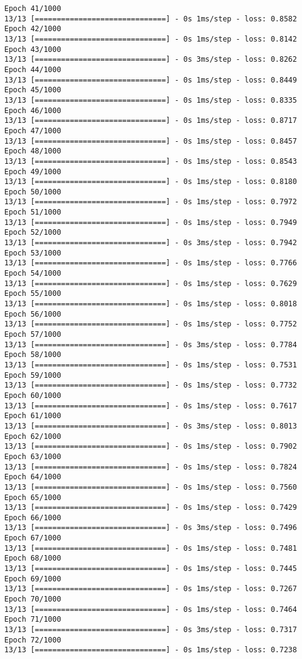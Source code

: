 \documentclass[11pt]{article}
\begin{document}
\begin{Verbatim}[commandchars=\\\{\}]
Epoch 41/1000
13/13 [==============================] - 0s 1ms/step - loss: 0.8582
Epoch 42/1000
13/13 [==============================] - 0s 1ms/step - loss: 0.8142
Epoch 43/1000
13/13 [==============================] - 0s 3ms/step - loss: 0.8262
Epoch 44/1000
13/13 [==============================] - 0s 1ms/step - loss: 0.8449
Epoch 45/1000
13/13 [==============================] - 0s 1ms/step - loss: 0.8335
Epoch 46/1000
13/13 [==============================] - 0s 1ms/step - loss: 0.8717
Epoch 47/1000
13/13 [==============================] - 0s 1ms/step - loss: 0.8457
Epoch 48/1000
13/13 [==============================] - 0s 1ms/step - loss: 0.8543
Epoch 49/1000
13/13 [==============================] - 0s 1ms/step - loss: 0.8180
Epoch 50/1000
13/13 [==============================] - 0s 1ms/step - loss: 0.7972
Epoch 51/1000
13/13 [==============================] - 0s 1ms/step - loss: 0.7949
Epoch 52/1000
13/13 [==============================] - 0s 3ms/step - loss: 0.7942
Epoch 53/1000
13/13 [==============================] - 0s 1ms/step - loss: 0.7766
Epoch 54/1000
13/13 [==============================] - 0s 1ms/step - loss: 0.7629
Epoch 55/1000
13/13 [==============================] - 0s 1ms/step - loss: 0.8018
Epoch 56/1000
13/13 [==============================] - 0s 1ms/step - loss: 0.7752
Epoch 57/1000
13/13 [==============================] - 0s 3ms/step - loss: 0.7784
Epoch 58/1000
13/13 [==============================] - 0s 1ms/step - loss: 0.7531
Epoch 59/1000
13/13 [==============================] - 0s 1ms/step - loss: 0.7732
Epoch 60/1000
13/13 [==============================] - 0s 1ms/step - loss: 0.7617
Epoch 61/1000
13/13 [==============================] - 0s 3ms/step - loss: 0.8013
Epoch 62/1000
13/13 [==============================] - 0s 1ms/step - loss: 0.7902
Epoch 63/1000
13/13 [==============================] - 0s 1ms/step - loss: 0.7824
Epoch 64/1000
13/13 [==============================] - 0s 1ms/step - loss: 0.7560
Epoch 65/1000
13/13 [==============================] - 0s 1ms/step - loss: 0.7429
Epoch 66/1000
13/13 [==============================] - 0s 3ms/step - loss: 0.7496
Epoch 67/1000
13/13 [==============================] - 0s 1ms/step - loss: 0.7481
Epoch 68/1000
13/13 [==============================] - 0s 1ms/step - loss: 0.7445
Epoch 69/1000
13/13 [==============================] - 0s 1ms/step - loss: 0.7267
Epoch 70/1000
13/13 [==============================] - 0s 1ms/step - loss: 0.7464
Epoch 71/1000
13/13 [==============================] - 0s 3ms/step - loss: 0.7317
Epoch 72/1000
13/13 [==============================] - 0s 1ms/step - loss: 0.7238

\end{Verbatim}
\end{document}
